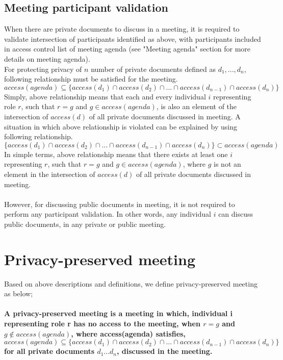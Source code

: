 \subsection{Meeting participant validation}
\noindent
When there are private documents to discuss in a meeting, it is required to validate intersection of participants identified as above, with participants included in access control list of meeting agenda (see "Meeting agenda" section for more details on meeting agenda).\\ 
For protecting privacy of $n$ number of private documents defined as $d_{1}, ... , d_{n}$, following relationship must be satisfied for the meeting. 
\[ access(agenda) \subseteq \{access(d_{1}) \cap access(d_{2}) \cap ... \cap access(d_{n-1}) \cap access(d_{n})\} \]
\noindent
Simply, above relationship means that each and every individual $i$ representing role $r$, such that $r = g$ and $g \in access(agenda)$, is also an element of the intersection of $access(d)$ of all private documents discussed in meeting.
A situation in which above relationship is violated can be explained by using following relationship. 
\[ \{access(d_{1}) \cap access(d_{2}) \cap ... \cap access(d_{n-1}) \cap access(d_{n})\} \subset access(agenda) \]
In simple terms, above relationship means that there exists at least one $i$ representing $r$, such that $r = g$ and $g \in access(agenda)$, where $g$ is not an element in the intersection of $access(d)$ of all private documents discussed in meeting.\\ \\
\noindent
However, for discussing public documents in meeting, it is not required to perform any participant validation. In other words, any individual $i$ can discuss public documents, in any private or public meeting.

\section{Privacy-preserved meeting}
Based on above descriptions and definitions, we define privacy-preserved meeting as below;\\ \\
\textbf{A privacy-preserved meeting is a meeting in which, individual i representing role r has no access to the meeting, when $r = g$ and $g \notin access(agenda)$, where access(agenda) satisfies,} 
\[access(agenda) \subseteq \{access(d_{1}) \cap access(d_{2}) \cap ... \cap access(d_{n-1}) \cap access(d_{n})\} \]
\textbf{for all private documents $d_{1} ... d_{n}$, discussed in the meeting.} 

